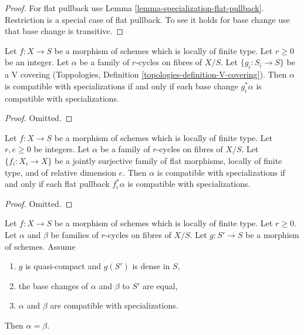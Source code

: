 \begin{proof}
For flat pullback use Lemma \ref{lemma-specialization-flat-pullback}.
Restriction is a special case of flat pullback. To see it holds for
base change use that base change is transitive.
\end{proof}

\begin{lemma}
\label{lemma-families-specialization-V-descent}
Let $f : X \to S$ be a morphism of schemes which is locally of finite type.
Let $r \geq 0$ be an integer. Let $\alpha$ be a family of $r$-cycles on fibres
of $X/S$. Let $\{g_i : S_i \to S\}$ be a V covering (Toppologies, Definition
\ref{topologies-definition-V-covering}). Then $\alpha$ is compatible
with specializations if and only if each base change $g_i^*\alpha$
is compatible with specializations.
\end{lemma}

\begin{proof}
Omitted.
\end{proof}

\begin{lemma}
\label{lemma-families-specialization-fppf-descent}
Let $f : X \to S$ be a morphism of schemes which is locally of finite type.
Let $r, e \geq 0$ be integers. Let $\alpha$ be a family of $r$-cycles on fibres
of $X/S$. Let $\{f_i : X_i \to X\}$ be a jointly surjective family
of flat morphisms, locally of finite type, and of relative dimension $e$.
Then $\alpha$ is compatible with specializations if and only if each flat
pullback $f_i^*\alpha$ is compatible with specializations.
\end{lemma}

\begin{proof}
Omitted.
\end{proof}

\begin{lemma}
\label{lemma-uniqueness-extension}
Let $f : X \to S$ be a morphism of schemes which is locally of finite type.
Let $r \geq 0$.
Let $\alpha$ and $\beta$ be families of $r$-cycles on fibres of $X/S$.
Let $g : S' \to S$ be a morphism of schemes. Assume
\begin{enumerate}
\item $g$ is quasi-compact and $g(S')$ is dense in $S$,
\item the base changes of $\alpha$ and $\beta$ to $S'$ are equal,
\item $\alpha$ and $\beta$ are compatible with specializations.
\end{enumerate}
Then $\alpha = \beta$.
\end{lemma}

